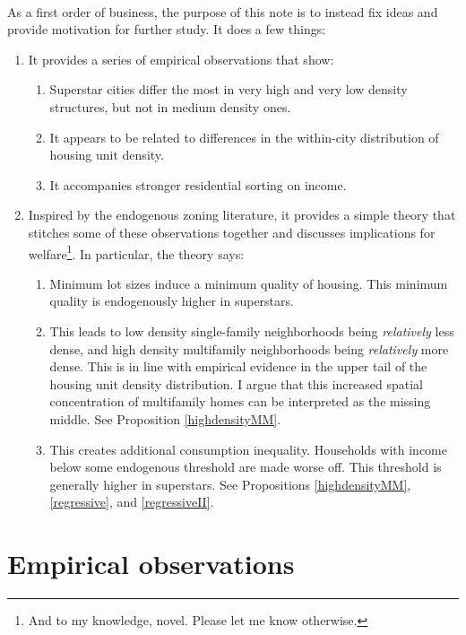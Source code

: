 \documentclass[]{article}
\theoremstyle{plain}
\begin{document}
\paragraph*{}
As a first order of business, the purpose of this note is to instead fix ideas and provide motivation for further study. It does a few things:
\begin{enumerate}
	\item It provides a series of empirical observations that show:
	\begin{enumerate}
		\item Superstar cities differ the most in very high and very low density structures, but not in medium density ones.
		\item It appears to be related to differences in the within-city distribution of housing unit density.
		\item It accompanies stronger residential sorting on income. 
		
	\end{enumerate}
\item Inspired by the endogenous zoning literature, it provides a simple theory that stitches some of these observations together and discusses implications for welfare\footnote{And to my knowledge, novel. Please let me know otherwise.}. In particular, the theory says:
	\begin{enumerate}
		\item Minimum lot sizes induce a minimum quality of housing. This minimum quality is endogenously higher in superstars.  
		\item This leads to low density single-family neighborhoods being \textit{relatively} less dense, and high density multifamily neighborhoods being \textit{relatively} more dense. This is in line with empirical evidence in the upper tail of the housing unit density distribution. I argue that this increased spatial concentration of multifamily homes can be interpreted as the missing middle. See Proposition \ref{highdensityMM}.
		\item This creates additional consumption inequality. Households with income below some endogenous threshold are made worse off. This threshold is generally higher in superstars. See Propositions \ref{highdensityMM}, \ref{regressive}, and \ref{regressiveII}. 
	\end{enumerate}
\end{enumerate}

\section{Empirical observations}
\end{document}
